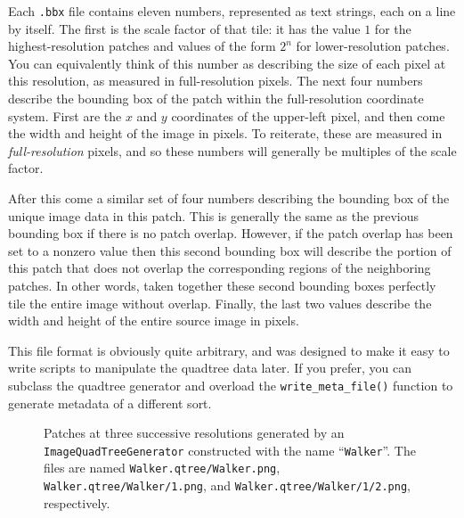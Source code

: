 Each \verb#.bbx# file contains eleven numbers, represented as text
strings, each on a line by itself.  The first is the scale factor of
that tile: it has the value $1$ for the highest-resolution patches and
values of the form $2^n$ for lower-resolution patches.  You can
equivalently think of this number as describing the size of each pixel
at this resolution, as measured in full-resolution pixels.  The next
four numbers describe the bounding box of the patch within the
full-resolution coordinate system.  First are the $x$ and $y$
coordinates of the upper-left pixel, and then come the width and
height of the image in pixels.  To reiterate, these are measured in
{\it full-resolution} pixels, and so these numbers will generally be
multiples of the scale factor.

After this come a similar set of four numbers describing the bounding
box of the unique image data in this patch.  This is generally the
same as the previous bounding box if there is no patch overlap.
However, if the patch overlap has been set to a nonzero value then
this second bounding box will describe the portion of this patch that
does not overlap the corresponding regions of the neighboring patches.
In other words, taken together these second bounding boxes perfectly
tile the entire image without overlap.  Finally, the last two values
describe the width and height of the entire source image in pixels.

This file format is obviously quite arbitrary, and was designed to 
make it easy to write scripts to manipulate the quadtree data later.  
If you prefer, you can subclass the quadtree generator and overload 
the \verb#write_meta_file()# function to generate metadata of a 
different sort.

\begin{figure}[t]
\centering
  \hfil
  \hfil
\caption{Patches at three successive resolutions generated by an {\tt ImageQuadTreeGenerator} 
constructed with the name ``{\tt Walker}''.  The files are named {\tt Walker.qtree/Walker.png}, 
{\tt Walker.qtree/Walker/1.png}, and {\tt Walker.qtree/Walker/1/2.png}, respectively.}
\label{fig:blend}
\end{figure}
